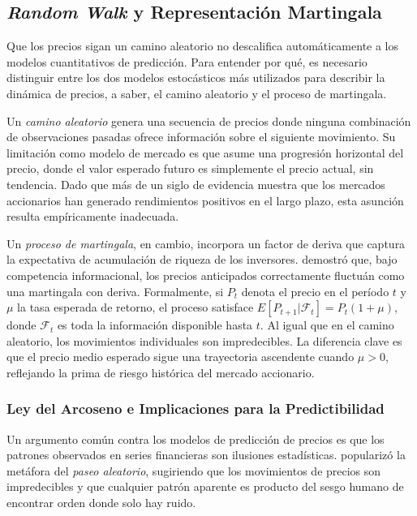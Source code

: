 ﻿\documentclass[11pt,a4paper]{article}
\begin{document}
\subsection{\textit{Random Walk} y Representaci\'on Martingala}

Que los precios sigan un camino aleatorio no descalifica autom\'aticamente a los modelos cuantitativos de predicci\'on. Para entender por qu\'e, es necesario distinguir entre los dos modelos estoc\'asticos m\'as utilizados para describir la din\'amica de precios, a saber, el camino aleatorio y el proceso de martingala.

Un \textit{camino aleatorio} genera una secuencia de precios donde ninguna combinaci\'on de observaciones pasadas ofrece informaci\'on sobre el siguiente movimiento. Su limitaci\'on como modelo de mercado es que asume una progresi\'on horizontal del precio, donde el valor esperado futuro es simplemente el precio actual, sin tendencia. Dado que m\'as de un siglo de evidencia muestra que los mercados accionarios han generado rendimientos positivos en el largo plazo, esta asunci\'on resulta emp\'iricamente inadecuada.

Un \textit{proceso de martingala}, en cambio, incorpora un factor de deriva que captura la expectativa de acumulaci\'on de riqueza de los inversores. \citet{samuelson1965} demostr\'o que, bajo competencia informacional, los precios anticipados correctamente fluctu\'an como una martingala con deriva. Formalmente, si $P_t$ denota el precio en el per\'iodo $t$ y $\mu$ la tasa esperada de retorno, el proceso satisface $E[P_{t+1} | \mathcal{F}_t] = P_t(1 + \mu)$, donde $\mathcal{F}_t$ es toda la informaci\'on disponible hasta $t$. Al igual que en el camino aleatorio, los movimientos individuales son impredecibles. La diferencia clave es que el precio medio esperado sigue una trayectoria ascendente cuando $\mu > 0$, reflejando la prima de riesgo hist\'orica del mercado accionario.

\subsubsection{Ley del Arcoseno e Implicaciones para la Predictibilidad}

Un argumento com\'un contra los modelos de predicci\'on de precios es que los patrones observados en series financieras son ilusiones estad\'isticas. \citet{malkiel1973} populariz\'o la met\'afora del \textit{paseo aleatorio}, sugiriendo que los movimientos de precios son impredecibles y que cualquier patr\'on aparente es producto del sesgo humano de encontrar orden donde solo hay ruido.
\end{document}

